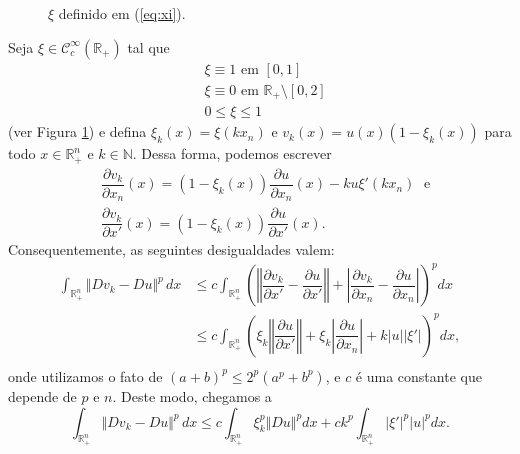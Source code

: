\documentclass[a4paper, 11pt]{book}
\theoremstyle{definition}
\newcommand{\bN}{\mathbb{N}}
\newcommand{\bR}{\mathbb{R}}
\newcommand{\cC}{\mathcal{C}}
\begin{document}
\begin{prf}
\begin{figure}
        \caption{$\xi$ definido em (\ref{eq:xi}).}
        \label{fig:xi}
    \end{figure}
    Seja $\xi \in \cC^{\infty}_c(\bR_+)$ tal que
    \begin{equation} \label{eq:xi}
        \begin{aligned}
            &\xi \equiv 1 \text{ em } [0,1]\\
            &\xi \equiv 0 \text{ em } \bR_+ \setminus [0,2]\\
            &0 \leqslant \xi \leqslant 1
        \end{aligned}
    \end{equation}
    (ver Figura \ref{fig:xi}) e defina $\xi_k(x) = \xi(kx_n)$ e $v_k(x) = u(x) (1 - \xi_k(x))$ para todo $x \in \bR^n_+$ e $k \in \bN$. Dessa forma, podemos escrever
    \[
        \begin{aligned}
            &\dfrac{\partial v_k}{\partial x_n}(x) = (1 - \xi_k(x))\dfrac{\partial u}{\partial x_n}(x) - ku\xi'(kx_n) \;\text{ e}\\
            &\dfrac{\partial v_k}{\partial x'}(x) = (1-\xi_k(x))\dfrac{\partial u}{\partial x'}(x).
        \end{aligned}
    \]
    Consequentemente, as seguintes desigualdades valem:
    \[
        \begin{aligned}
            \int_{\bR^n_+} \Vert Dv_k - Du \Vert^p \,dx &\leqslant c \int_{\bR^n_+} \left( \left\Vert \dfrac{\partial v_k}{\partial x'} - \dfrac{\partial u}{\partial x'} \right\Vert + \left| \dfrac{\partial v_k}{\partial x_n} - \dfrac{\partial u}{\partial x_n} \right| \right)^p dx\\
            &\leqslant c  \int_{\bR^n_+} \left( \xi_k\left\Vert \dfrac{\partial u}{\partial x'} \right\Vert + \xi_k \left| \dfrac{\partial u}{\partial x_n}\right| + k |u| |\xi'|  \right)^p dx,\\ 
        \end{aligned}
    \]
    onde utilizamos o fato de $(a + b)^p \leqslant 2^p (a^p + b^p)$, e $c$ é uma constante que depende de $p$ e $n$. Deste modo, chegamos a
    \begin{equation} \label{eq:asxa}
        \int_{\bR^n_+} \Vert Dv_k - Du \Vert^p \,dx \leqslant c \int_{\bR^n_+} \xi_k^p \Vert Du \Vert^p dx + ck^p \int_{\bR^n_+} |\xi'|^p |u|^p dx.

\end{equation}
\end{prf}
\end{document}

